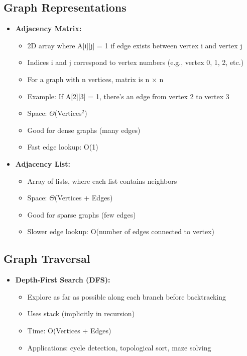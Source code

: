 \documentclass[11pt,a4paper]{article}
\begin{document}
\begin{multicols}{2}
\subsection{Graph Representations}
\begin{itemize}
    \item \textbf{Adjacency Matrix:}
    \begin{itemize}
        \item 2D array where A[i][j] = 1 if edge exists between vertex i and vertex j
        \item Indices i and j correspond to vertex numbers (e.g., vertex 0, 1, 2, etc.)
        \item For a graph with n vertices, matrix is n $\times$ n
        \item Example: If A[2][3] = 1, there's an edge from vertex 2 to vertex 3
        \item Space: $\Theta$(Vertices$^2$)
        \item Good for dense graphs (many edges)
        \item Fast edge lookup: O(1)
    \end{itemize}

    \item \textbf{Adjacency List:}
    \begin{itemize}
        \item Array of lists, where each list contains neighbors
        \item Space: $\Theta$(Vertices + Edges)
        \item Good for sparse graphs (few edges)
        \item Slower edge lookup: O(number of edges connected to vertex)
    \end{itemize}
\end{itemize}

\subsection{Graph Traversal}
\begin{itemize}
    \item \textbf{Depth-First Search (DFS):}
    \begin{itemize}
        \item Explore as far as possible along each branch before backtracking
        \item Uses stack (implicitly in recursion)
        \item Time: O(Vertices + Edges)
        \item Applications: cycle detection, topological sort, maze solving
    \end{itemize}


\end{itemize}
\end{multicols}
\end{document}
